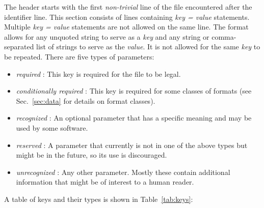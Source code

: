 \documentclass[12pt]{article}
\begin{document}
The header starts with the first {\em non-trivial} line of the file encountered after the identifier line.
This section consists of lines containing {\em key = value} statements.
Multiple {\em key = value} statements are not allowed on the same line.
The format allows for any unquoted string to serve as a {\em key} and any string or comma-separated list of strings to serve as the {\em value}.
It is not allowed for the same {\em key} to be repeated.
There are five types of parameters:
\begin{itemize}
\item {\em required} : This key is required for the file to be legal.
\item {\em conditionally required} : This key is required for some classes of formats (see Sec.~\ref{sec:data} for details on format classes).
\item {\em recognized} : An optional parameter that has a specific meaning and may be used by some software.
\item {\em reserved} : A parameter that currently is not in one of the above types but might be in the future, so its use is discouraged.
\item {\em unrecognized} : Any other parameter.  Mostly these contain additional information that might be of interest to a human reader.
\end{itemize}
\noindent
A table of keys and their types is shown in Table~\ref{tab:keys}:
\end{document}
